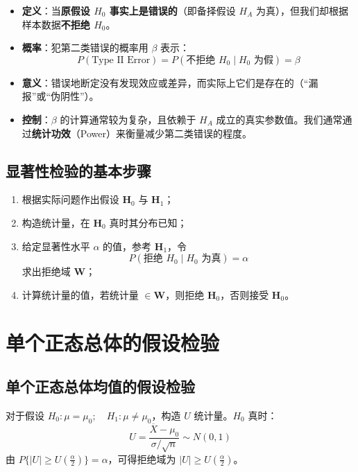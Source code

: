 \begin{definition}
\begin{itemize}
	\item \textbf{定义}：当\textbf{原假设 $H_0$ 事实上是错误的}（即备择假设 $H_A$ 为真），但我们却根据样本数据\textbf{不拒绝 $H_0$}。
	\item \textbf{概率}：犯第二类错误的概率用 $\beta$ 表示：
	\begin{equation}
		P(\text{Type II Error}) = P(\text{不拒绝 } H_0 \mid H_0 \text{ 为假}) = \beta
		\label{eq:假设检验:第二类错误}
	\end{equation}
	\item \textbf{意义}：错误地断定没有发现效应或差异，而实际上它们是存在的（“漏报”或“伪阴性”）。
	\item \textbf{控制}：$\beta$ 的计算通常较为复杂，且依赖于 $H_A$ 成立的真实参数值。我们通常通过\textbf{统计功效}（Power）来衡量减少第二类错误的程度。
\end{itemize}
\end{definition}

\subsection{显著性检验的基本步骤}
\begin{property}[显著性检验的基本步骤]
\begin{enumerate}
	\item 根据实际问题作出假设 $\boldsymbol{H}_0$ 与 $\boldsymbol{H}_1$；
	\item 构造统计量，在 $\boldsymbol{H}_0$ 真时其分布已知；
	\item 给定显著性水平 $\alpha$ 的值，参考 $\boldsymbol{H}_1$，令
	\begin{equation}
		P(\text{拒绝 } H_0 \mid H_0 \text{ 为真}) = \alpha
		\label{eq:假设检验:拒绝域}
	\end{equation}
	求出拒绝域 $\boldsymbol{W}$；
	\item 计算统计量的值，若统计量 $\in \boldsymbol{W}$，则拒绝 $\boldsymbol{H}_0$，否则接受 $\boldsymbol{H}_0$。
\end{enumerate}
\end{property}

\section{单个正态总体的假设检验}
\subsection{单个正态总体均值的假设检验}
\begin{theorem}
对于假设 $H_0: \mu = \mu_0;\quad H_1: \mu \neq \mu_0$，构造 $U$ 统计量。$H_0$ 真时：
\begin{equation}
	U = \frac{\overline{X} - \mu_0}{\sigma/\sqrt{n}} \sim N(0, 1)
	\label{eq:假设检验:U}
\end{equation}
由 $P\{|U| \ge U(\frac{\alpha}{2})\} = \alpha$，可得拒绝域为 $|U| \ge U(\frac{\alpha}{2})$。
\end{theorem}

